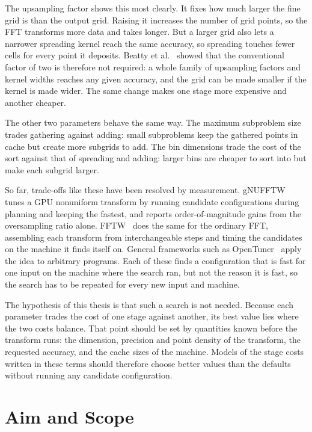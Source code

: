 The upsampling factor shows this most clearly. It fixes how much larger the fine
grid is than the output grid. Raising it increases the number of grid points, so
the FFT transforms more data and takes longer. But a larger grid also lets a
narrower spreading kernel reach the same accuracy, so spreading touches fewer
cells for every point it deposits. Beatty et al.~\cite{beatty2005} showed that
the conventional factor of two is therefore not required: a whole family of
upsampling factors and kernel widths reaches any given accuracy, and the grid
can be made smaller if the kernel is made wider. The same change makes one stage
more expensive and another cheaper.

The other two parameters behave the same way. The maximum subproblem size trades
gathering against adding: small subproblems keep the gathered points in cache
but create more subgrids to add. The bin dimensions trade the cost of the sort
against that of spreading and adding: larger bins are cheaper to sort into but
make each subgrid larger.

So far, trade-offs like these have been resolved by measurement.
gNUFFTW~\cite{ou2017} tunes a GPU nonuniform transform by running candidate
configurations during planning and keeping the fastest, and reports
order-of-magnitude gains from the oversampling ratio alone. FFTW~\cite{frigo2005}
does the same for the ordinary FFT, assembling each transform from
interchangeable steps and timing the candidates on the machine it finds itself
on. General frameworks such as OpenTuner~\cite{ansel2014opentuner} apply the idea
to arbitrary programs. Each of these finds a configuration that is fast for one
input on the machine where the search ran, but not the reason it is fast, so
the search has to be repeated for every new input and machine.

The hypothesis of this thesis is that such a search is not needed. Because each
parameter trades the cost of one stage against another, its best value lies
where the two costs balance. That point should be set by quantities known before
the transform runs: the dimension, precision and point density of the
transform, the requested accuracy, and the cache sizes of the machine. Models of
the stage costs written in these terms should therefore choose better values
than the defaults without running any candidate configuration.

\section{Aim and Scope}
\label{sec:aim_scope}

